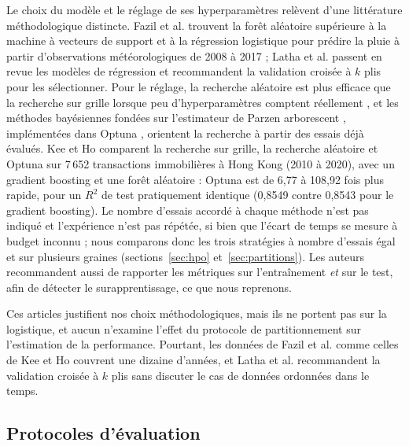 \documentclass[11pt,a4paper]{article}
\theoremstyle{definition}
\begin{document}
Le choix du modèle et le réglage de ses hyperparamètres relèvent d'une littérature méthodologique distincte. Fazil et al. \cite{fazil2023comparative} trouvent la forêt aléatoire \cite{breiman2001random} supérieure à la machine à vecteurs de support et à la régression logistique pour prédire la pluie à partir d'observations météorologiques de 2008 à 2017 ; Latha et al. \cite{latha2024overview} passent en revue les modèles de régression et recommandent la validation croisée à $k$ plis pour les sélectionner. Pour le réglage, la recherche aléatoire est plus efficace que la recherche sur grille lorsque peu d'hyperparamètres comptent réellement \cite{bergstra2012random}, et les méthodes bayésiennes fondées sur l'estimateur de Parzen arborescent \cite{bergstra2011algorithms}, implémentées dans Optuna \cite{akiba2019optuna}, orientent la recherche à partir des essais déjà évalués. Kee et Ho \cite{kee2025optimizing} comparent la recherche sur grille, la recherche aléatoire et Optuna sur 7\,652 transactions immobilières à Hong Kong (2010 à 2020), avec un gradient boosting et une forêt aléatoire : Optuna est de 6,77 à 108,92 fois plus rapide, pour un $R^2$ de test pratiquement identique (0,8549 contre 0,8543 pour le gradient boosting). Le nombre d'essais accordé à chaque méthode n'est pas indiqué et l'expérience n'est pas répétée, si bien que l'écart de temps se mesure à budget inconnu ; nous comparons donc les trois stratégies à nombre d'essais égal et sur plusieurs graines (sections~\ref{sec:hpo} et~\ref{sec:partitions}). Les auteurs recommandent aussi de rapporter les métriques sur l'entraînement \emph{et} sur le test, afin de détecter le surapprentissage, ce que nous reprenons.

Ces articles justifient nos choix méthodologiques, mais ils ne portent pas sur la logistique, et aucun n'examine l'effet du protocole de partitionnement sur l'estimation de la performance. Pourtant, les données de Fazil et al. comme celles de Kee et Ho couvrent une dizaine d'années, et Latha et al. recommandent la validation croisée à $k$ plis sans discuter le cas de données ordonnées dans le temps.

\subsection{Protocoles d'évaluation}
\label{sec:rw-protocoles}
\end{document}
